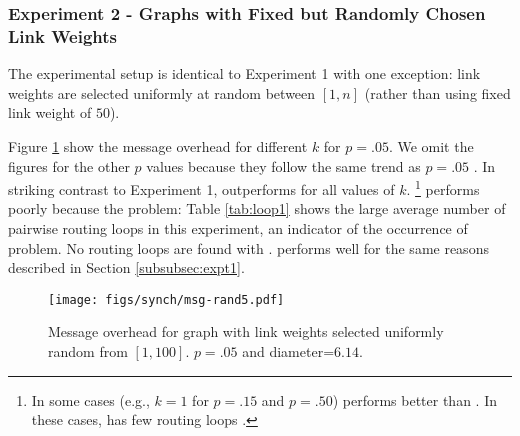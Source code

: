 



\subsubsection{Experiment 2 - \er Graphs with Fixed but Randomly Chosen Link Weights}
\label{subsec:expt2}


The experimental setup is identical to Experiment 1 with one exception: link weights are selected uniformly at random between $[1,n]$ (rather than using 
fixed link weight of $50$).

Figure \ref{fig:msg-rand} show the message overhead for different $k$ for $p=.05$. We omit the figures for the other $p$ values because they follow the 
same trend as $p=.05$ \cite{Tech}.
In striking contrast to Experiment 1, \purge outperforms \second for all values of $k$. 
{\footnote {\small In some cases (e.g., $k=1$ for $p=.15$ and $p=.50$) \second performs better than \purges.  In these cases, \second has few routing loops \cite{Tech}.
}}
\second performs poorly because the \infinity problem: Table \ref{tab:loop1} shows the large average number of pairwise routing loops in this experiment, 
an indicator of the occurrence of \infinity problem.
No routing loops are found with \purges. \cpr performs well for the same reasons described in Section \ref{subsubsec:expt1}.  


\begin{figure}[t]
\centering
\texttt{[image: figs/synch/msg-rand5.pdf]}
\caption{Message overhead for \er graph with link weights selected uniformly random from $[1,100]$. $p=.05$ and diameter=$6.14$.}
\label{fig:msg-rand}
\end{figure}




